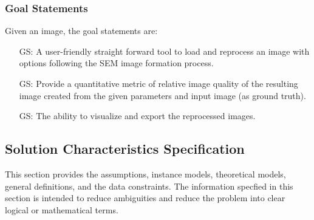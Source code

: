 \documentclass[12pt]{article}
\newcounter{goalnum} %
\begin{document}
\subsubsection{Goal Statements}

\noindent Given an image, the goal statements are:

\begin{itemize}

\item[GS\refstepcounter{goalnum}\thegoalnum \label{G_easeofuse}:] {
A user-friendly straight forward tool to load and reprocess an image with options following the SEM image formation process.
}

\item[GS\refstepcounter{goalnum}\thegoalnum \label{G_metric}:] {
Provide a quantitative metric of relative image quality of the resulting image created from the given parameters and input image (as ground truth).
}

\item[GS\refstepcounter{goalnum}\thegoalnum \label{G_visualize}:] {
The ability to visualize and export the reprocessed images.
}

\end{itemize}

\subsection{Solution Characteristics Specification}

This section provides the assumptions, instance models, theoretical models, general definitions, and the data constraints. The information specfied in this section is intended to reduce ambiguities and reduce the problem into clear logical or mathematical terms.

\end{document}
